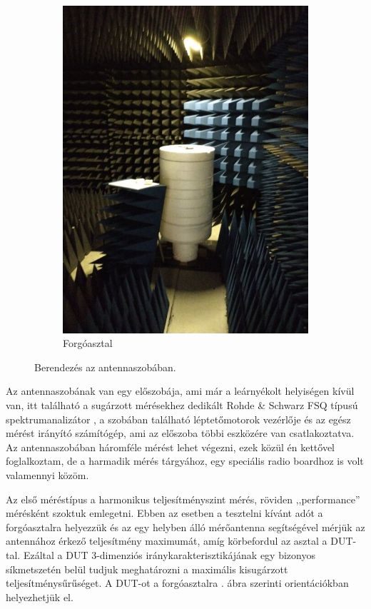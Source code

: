 \begin{figure}
\begin{subfigure}{0.4\textwidth}
                    \includegraphics[width=\textwidth]{kep/szerkesztett/antennaszoba-asztal.jpg}
                    \caption{Forgóasztal}
                \end{subfigure}
                \caption{Berendezés az antennaszobában.}
                \label{fig:antennaszoba}
            \end{figure}
            \par
            Az antennaszobának van egy előszobája, ami már a leárnyékolt helyiségen kívül van, itt található a sugárzott mérésekhez dedikált Rohde \& Schwarz FSQ típusú spektrumanalizátor \cite{RS}, a szobában található léptetőmotorok vezérlője és az egész mérést irányító számítógép, ami az előszoba többi eszközére van csatlakoztatva. Az antennaszobában háromféle mérést lehet végezni, ezek közül én kettővel foglalkoztam, de a harmadik mérés tárgyához, egy speciális radio boardhoz is volt valamennyi közöm.
            \par
            Az első méréstípus a harmonikus teljesítményszint mérés, röviden ,,performance'' mérésként szoktuk emlegetni. Ebben az esetben a tesztelni kívánt adót a forgóasztalra helyezzük és az egy helyben álló mérőantenna segítségével mérjük az antennához érkező teljesítmény maximumát, amíg körbefordul az asztal a DUT-tal. Ezáltal a DUT 3-dimenziós iránykarakterisztikájának egy bizonyos síkmetszetén belül tudjuk meghatározni a maximális kisugárzott teljesítménysűrűséget. A DUT-ot a forgóasztalra . ábra szerinti orientációkban helyezhetjük el.
